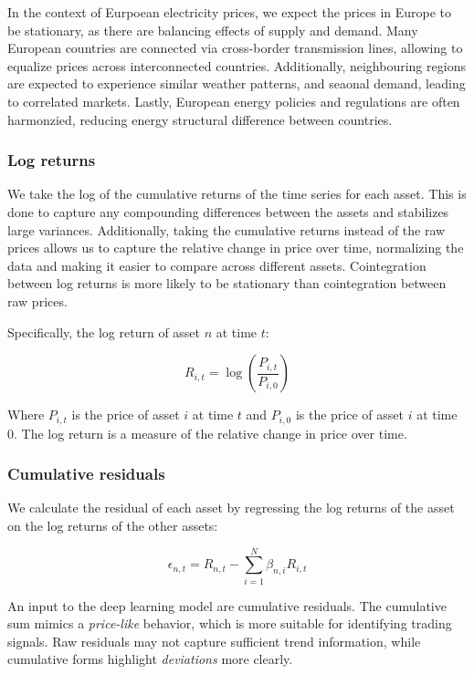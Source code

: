 \documentclass[12pt]{article}
\begin{document}
In the context of Eurpoean electricity prices, we expect the prices in Europe to be stationary, as there are balancing effects of supply and demand. Many European countries are connected via cross-border transmission lines, allowing to equalize prices across interconnected countries. Additionally, neighbouring regions are expected to experience similar weather patterns, and seaonal demand, leading to correlated markets. Lastly, European energy policies and regulations are often harmonzied, reducing energy structural difference between countries.

\subsubsection{Log returns}

We take the log of the cumulative returns of the time series for each asset. This is done to capture any compounding differences between the assets and stabilizes large variances. Additionally, taking the cumulative returns instead of the raw prices allows us to capture the relative change in price over time, normalizing the data and making it easier to compare across different assets. Cointegration between log returns is more likely to be stationary than cointegration between raw prices.

Specifically, the log return of asset $n$ at time $t$:

\begin{equation}
    R_{i,t} = \log\left( \frac{P_{i,t}}{P_{i,0}} \right)
    \label{eq:log_cumulative_return}
\end{equation}

Where $P_{i,t}$ is the price of asset $i$ at time $t$ and $P_{i,0}$ is the price of asset $i$ at time $0$. The log return is a measure of the relative change in price over time.

\subsubsection{Cumulative residuals}
We calculate the residual of each asset by regressing the log returns of the asset on the log returns of the other assets:

\begin{equation}
    \epsilon_{n,t} = R_{n,t} - \sum_{i=1}^{N} \beta_{n,i} R_{i,t}
    \label{eq:residual}
\end{equation}

An input to the deep learning model are cumulative residuals. 
The cumulative sum mimics a \textit{price-like} behavior, which is more suitable for identifying trading signals. Raw residuals may not capture sufficient trend information, while cumulative forms highlight \textit{deviations} more clearly.
\end{document}
